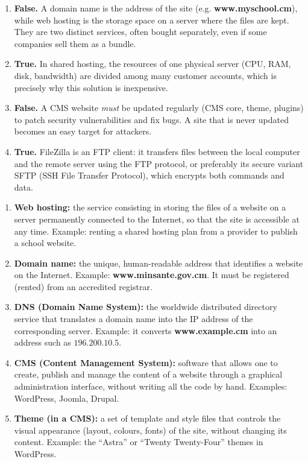 \documentclass[11pt]{article}
\begin{document}
\begin{corrige}
\begin{enumerate}
\item \textbf{False.} A domain name is the address of the site (e.g. \textbf{www.myschool.cm}), while web hosting is the storage space on a server where the files are kept. They are two distinct services, often bought separately, even if some companies sell them as a bundle.
\item \textbf{True.} In shared hosting, the resources of one physical server (CPU, RAM, disk, bandwidth) are divided among many customer accounts, which is precisely why this solution is inexpensive.
\item \textbf{False.} A CMS website \emph{must} be updated regularly (CMS core, theme, plugins) to patch security vulnerabilities and fix bugs. A site that is never updated becomes an easy target for attackers.
\item \textbf{True.} FileZilla is an FTP client: it transfers files between the local computer and the remote server using the FTP protocol, or preferably its secure variant SFTP (SSH File Transfer Protocol), which encrypts both commands and data.
\end{enumerate}
\end{corrige}

\begin{corrige}
\begin{enumerate}
\item \textbf{Web hosting:} the service consisting in storing the files of a website on a server permanently connected to the Internet, so that the site is accessible at any time. Example: renting a shared hosting plan from a provider to publish a school website.
\item \textbf{Domain name:} the unique, human-readable address that identifies a website on the Internet. Example: \textbf{www.minsante.gov.cm}. It must be registered (rented) from an accredited registrar.
\item \textbf{DNS (Domain Name System):} the worldwide distributed directory service that translates a domain name into the IP address of the corresponding server. Example: it converts \textbf{www.example.cm} into an address such as $196.200.10.5$.
\item \textbf{CMS (Content Management System):} software that allows one to create, publish and manage the content of a website through a graphical administration interface, without writing all the code by hand. Examples: WordPress, Joomla, Drupal.
\item \textbf{Theme (in a CMS):} a set of template and style files that controls the visual appearance (layout, colours, fonts) of the site, without changing its content. Example: the ``Astra'' or ``Twenty Twenty-Four'' themes in WordPress.
\end{enumerate}
\end{corrige}
\end{document}

